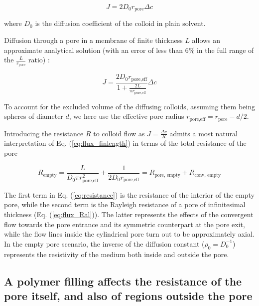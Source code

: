 \documentclass[12pt, a4paper]{article}
\begin{document}
\begin{equation}
    J=2D_0r_{\text{pore}}\Delta c
    \label{eq:flux_Ral}
\end{equation}

\noindent where $D_0$ is the diffusion coefficient of the colloid in plain solvent. 

Diffusion through a pore in a membrane of finite thickness $L$ allows an approximate analytical solution (with an error of less than 6\% in the full range of the $\frac{L}{r_{\text{pore}}}$ ratio) \cite{Brunn1984}: 

\begin{equation}
    J=\frac{2D_0r_{\text{pore,eff}}}{1+\frac{2L}{\pi r_{\text{pore,eff}}}}\Delta c
    \label{eq:flux_finlength}
\end{equation}

\noindent To account for the excluded volume of the diffusing colloids, assuming them being spheres of diameter $d$, we here use the effective pore radius $r_{\text{pore,eff}}=r_{\text{pore}}-d/2$.

Introducing the resistance $R$ to colloid flow as $J=\frac{\Delta c}{R}$ admits a most natural interpretation of Eq. (\ref{eq:flux_finlength}) in terms of the total resistance of the pore

\begin{equation}
    R_{\text{empty}}=\frac{L}{D_0\pi r_{\text{pore,eff}}^{2}}+\frac{1}{2D_0r_{\text{pore,eff}}}=R_{\text{pore, empty}}+R_{\text{conv, empty}}
    \label{eq:resistance}
\end{equation}

\noindent The first term in Eq. (\ref{eq:resistance}) is the resistance of the interior of the empty pore, 
while the second term is the Rayleigh resistance of a pore of infinitesimal thickness (Eq. (\ref{eq:flux_Ral})). 
The latter represents the effects of the convergent flow towards the pore entrance and its symmetric counterpart at the pore exit, 
while the flow lines inside the cylindrical pore turn out to be approximately axial. 
In the empty pore scenario, the inverse of the diffusion constant ($\rho_0=D_0^{-1}$) represents the resistivity of the medium both inside and outside the pore. 

\subsection{A polymer filling affects the resistance of the pore itself, and also of regions outside the pore}
\end{document}
